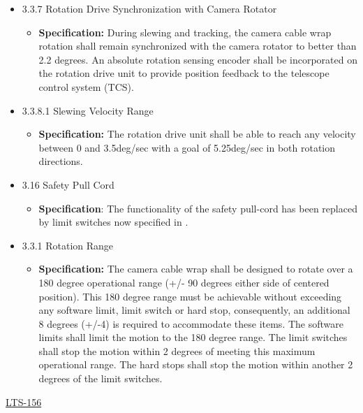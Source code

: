 \documentclass[SE,authoryear,toc]{lsstdoc}
\begin{document}
\begin{itemize}
\item
  3.3.7 Rotation Drive Synchronization with Camera Rotator

  \begin{itemize}
  \item
    \textbf{Specification:} During slewing and tracking, the camera
    cable wrap rotation shall remain synchronized with the camera
    rotator to better than 2.2 degrees. An absolute rotation sensing
    encoder shall be incorporated on the rotation drive unit to provide
    position feedback to the telescope control system (TCS).
  \end{itemize}
\item
  3.3.8.1 Slewing Velocity Range

  \begin{itemize}
  \item
    \textbf{Specification:} The rotation drive unit shall be able to
    reach any velocity between 0 and 3.5deg/sec with a goal of
    5.25deg/sec in both rotation directions.
  \end{itemize}
\item
  3.16 Safety Pull Cord

  \begin{itemize}
  \item
    \textbf{Specification}: The functionality of the safety pull-cord
    has been replaced by limit switches now specified in .
  \end{itemize}
\item
  3.3.1 Rotation Range

  \begin{itemize}
  \item
    \textbf{Specification:} The camera cable wrap shall be designed to rotate
    over a 180 degree operational range (+/- 90 degrees either side of
    centered position). This 180 degree range must be achievable without
    exceeding any software limit, limit switch or hard stop,
    consequently, an additional 8 degrees (+/-4) is required to
    accommodate these items. The software limits shall limit the motion
    to the 180 degree range. The limit switches shall stop the motion
    within 2 degrees of meeting this maximum operational range. The hard
    stops shall stop the motion within another 2 degrees of the limit
    switches.
  \end{itemize}
\end{itemize}

\underline{LTS-156}
\end{document}
